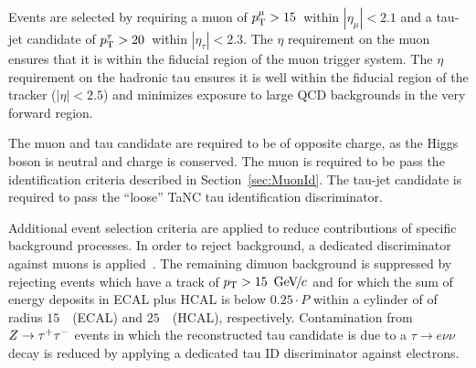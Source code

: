 Events are selected by requiring a muon of $p_{\mathrm{T}}^{\mu} > 15$~\GeVc within $
\left| \eta_{\mu} \right| < 2.1$ and a tau-jet candidate of
$p_{\mathrm{T}}^{\tau} > 20$~\GeVc within $|\eta_{\tau}| < 2.3$.
The $\eta$ requirement on the muon ensures that it is within the fiducial region
of the muon trigger system.  The $\eta$ requirement on the hadronic tau ensures
it is well within the fiducial region of the tracker ($|\eta| < 2.5$) and
minimizes exposure to large QCD backgrounds in the very forward region.

The muon and tau candidate are required to be of opposite charge, as the
Higgs boson is neutral and charge is conserved.  The muon is required to be pass the
identification criteria described in Section~\ref{sec:MuonId}.   The tau-jet
candidate is required to pass the ``loose'' TaNC tau identification
discriminator. 

Additional event selection criteria are applied to reduce contributions of
specific background processes. In order to reject \ZMM background, a dedicated
discriminator against muons is applied~\cite{CMS-PAS-PFT-08-001}. The remaining
dimuon background is suppressed by rejecting events which have a track of $p_{\mathrm{T}}
> 15~{\,\text{Ge\hspace{-.08em}V\hspace{-0.16em}/\hspace{-0.08em}}c}$ and for which the sum of energy deposits in ECAL plus HCAL is below
$0.25 \cdot P$ within a cylinder of of radius $15$~\centi\meter~(ECAL) and
$25$~\centi\meter~(HCAL), respectively.  Contamination from $Z \to \tau^+\tau^-$ events
in which the reconstructed tau candidate is due to a $\tau \to e \nu \nu$
decay is reduced by applying a dedicated tau ID discriminator against electrons.

